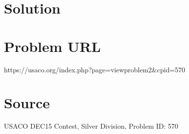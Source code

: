 \documentclass[12pt]{article}
\begin{document}
\section*{Solution}


\section*{Problem URL}
https://usaco.org/index.php?page=viewproblem2&cpid=570

\section*{Source}
USACO DEC15 Contest, Silver Division, Problem ID: 570
\end{document}
